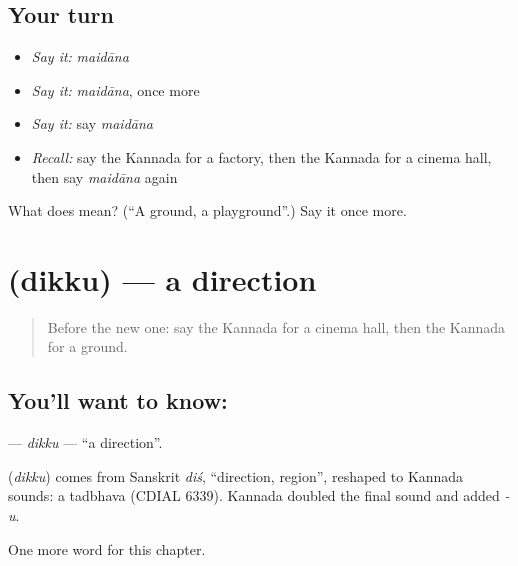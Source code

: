 \subsection*{Your turn}
\begin{itemize}
\raggedright
  \item \emph{Say it:} \emph{maidāna}
  \item \emph{Say it:} \emph{maidāna}, once more
  \item \emph{Say it:} say \emph{maidāna}
  \item \emph{Recall:} say the Kannada for a factory, then the Kannada for a cinema hall, then say \emph{maidāna} again
\end{itemize}

\begin{tcolorbox}[breakable,colback=teal!4,colframe=teal!35!black,title={Before you move on}]
What does  mean? (\textquotedblleft{}A ground, a playground\textquotedblright{}.) Say it once more.
\end{tcolorbox}
\section[\texorpdfstring{\kn{ದಿಕ್ಕು} (dikku)}{ದಿಕ್ಕು (dikku)}]{ (dikku) — a direction}

\label{lesson:KA-C212-dikku}



\begin{quote}
Before the new one: say the Kannada for a cinema hall, then the Kannada for a ground.
\end{quote}

\subsection*{You'll want to know: }
\textbf{} — \emph{dikku} — \textquotedblleft{}a direction\textquotedblright{}.

\begin{cousinweb}
\textbf{} (\emph{dikku}) comes from Sanskrit \emph{diś}, \textquotedblleft{}direction, region\textquotedblright{}, reshaped to Kannada sounds: a tadbhava (CDIAL 6339). Kannada doubled the final sound and added \emph{-u}.
\end{cousinweb}

\begin{grammarlens}[title={What you've built}]
One more word for this chapter.
\end{grammarlens}

